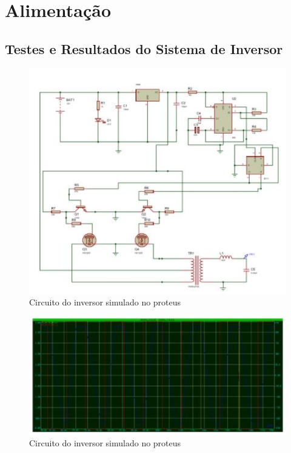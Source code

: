 \section{Alimentação}
	\subsection{Testes e Resultados do Sistema de Inversor}
	
			\begin{figure}[H]
				\begin{center}
					\includegraphics[scale = 0.75]{figuras/Circuito_Inversor}
					\caption{Circuito do inversor simulado no proteus
						}
				\end{center}
			\end{figure}
			
						\begin{figure}[H]
							\begin{center}
								\includegraphics[scale = 0.75]{figuras/Simulacao_Inversor}
								\caption{Circuito do inversor simulado no proteus}
							\end{center}
						\end{figure}

